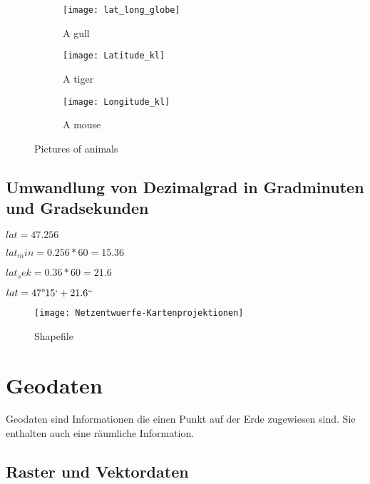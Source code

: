\documentclass[11pt,fleqn]{book} %
\begin{document}
 
\begin{figure}
        \centering
        \begin{subfigure}[h]{0.2\textwidth}
                \texttt{[image: lat\_long\_globe]}
                \caption{A gull}
                \label{fig:gull}
        \end{subfigure}
     
        \begin{subfigure}[h]{0.2\textwidth}
                \texttt{[image: Latitude\_kl]}
                \caption{A tiger}
                \label{fig:tiger}
        \end{subfigure}
      
        \begin{subfigure}[h]{0.2\textwidth}
                \texttt{[image: Longitude\_kl]}
                \caption{A mouse}
                \label{fig:mouse}
        \end{subfigure}
        \caption{Pictures of animals}\label{fig:animals}
\end{figure} 

\section{Umwandlung von Dezimalgrad in Gradminuten und Gradsekunden}

$lat=47.256$

$lat_min=0.256*60=15.36$

$lat_sek=0.36*60=21.6$

$lat=47\degree15`+21.6``$
\begin{figure}[h]
\centering\texttt{[image: Netzentwuerfe-Kartenprojektionen]}
\caption{Shapefile}
\end{figure}



\chapter{Geodaten}
Geodaten sind Informationen die einen Punkt auf der Erde zugewiesen sind. Sie enthalten auch eine r\"aumliche Information.
\section{Raster und Vektordaten}
\end{document}
